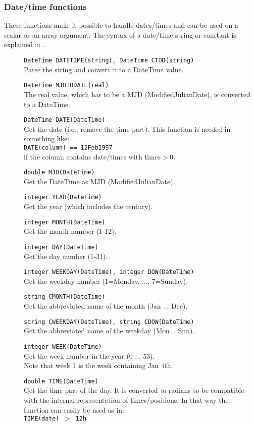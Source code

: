 \subsubsection{Date/time functions}
These functions make it possible to handle dates/times and can be used
on a scalar or an array argument. 
The syntax of a date/time string or constant is explained in
.
\begin{description}
  \item[] \texttt{DateTime DATETIME(string),  DateTime CTOD(string)}\\
       Parse the string and convert it to a DateTime value.
  \item[] \texttt{DateTime MJDTODATE(real)}\\
       The real value, which has to be a MJD (ModifiedJulianDate), is
       converted to a DateTime.
  \item[] \texttt{DateTime DATE(DateTime)}\\
        Get the date (i.e., remove the time part). This function is
        needed in something like:
       \\\texttt{DATE(column) == 12Feb1997}
       \\if the column contains date/times with times$>$0.
  \item[] \texttt{double MJD(DateTime)}\\
        Get the DateTime as MJD (ModifiedJulianDate).
  \item[] \texttt{integer YEAR(DateTime)}\\
        Get the year (which includes the century).
  \item[] \texttt{integer MONTH(DateTime)}\\
        Get the month number (1-12).
  \item[] \texttt{integer DAY(DateTime)}\\
        Get the day number (1-31).
  \item[] \texttt{integer WEEKDAY(DateTime),  integer DOW(DateTime)}\\
        Get the weekday number (1=Monday, ..., 7=Sunday).
  \item[] \texttt{string CMONTH(DateTime)}\\
        Get the abbreviated name of the month (Jan ... Dec).
  \item[] \texttt{string CWEEKDAY(DateTime),  string CDOW(DateTime)}\\
        Get the abbreviated name of the weekday (Mon .. Sun).
  \item[] \texttt{integer WEEK(DateTime)}\\
        Get the week number in the year (0 ... 53).
        \\Note that week 1 is the week containing Jan 4th.
  \item[] \texttt{double TIME(DateTime)}\\
       Get the time part of the day. It is converted to radians to
       be compatible with the internal representation of times/positions.
       In that way the function can easily be used as in:
       \\\texttt{TIME(date) $>$ 12h}
\end{description}
